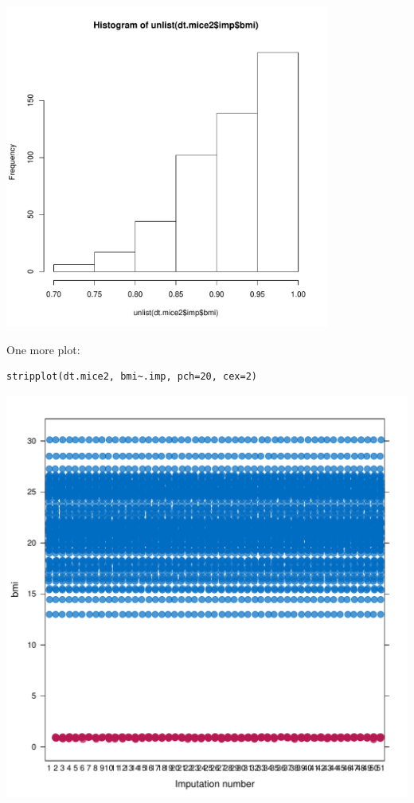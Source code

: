 \documentclass[12pt]{article}
\begin{document}
\begin{center}
\includegraphics[width=0.8\textwidth]{./figures/histImputed2.pdf}
\end{center}

\clearpage

One more plot:
\lstset{language=r,label= ,caption= ,captionpos=b,numbers=none}
\begin{lstlisting}
stripplot(dt.mice2, bmi~.imp, pch=20, cex=2)
\end{lstlisting}

\begin{center}
\includegraphics[width=.9\linewidth]{./figures/striplotImputed2.pdf}
\end{center}
\end{document}
